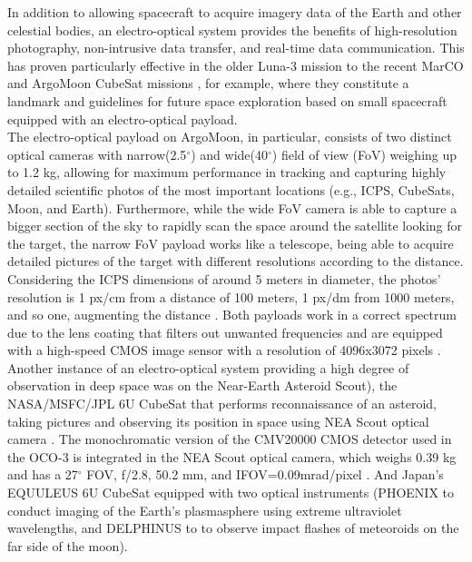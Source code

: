 \documentclass[final,5p,times,sort&compress,twocolumn]{elsarticle}
\begin{document}
In addition to allowing spacecraft to acquire imagery data of the Earth and other celestial bodies, an electro-optical system provides the benefits of high-resolution photography, non-intrusive data transfer, and real-time data communication. This has proven particularly effective in the older Luna-3 mission \cite{siddiqi2018beyond} to the recent MarCO \cite{schoolcraft2017marco} and ArgoMoon CubeSat missions \cite{di2019argomoon}, for example, where they constitute a landmark and guidelines for future space exploration based on small spacecraft equipped with an electro-optical payload. \\The electro-optical payload on ArgoMoon, in particular, consists of two distinct optical cameras \cite{di2019argomoon} with narrow(2.5$^\circ$) and wide(40$^\circ$) field of view (FoV) weighing up to 1.2 kg, allowing for maximum performance in tracking and capturing highly detailed scientific photos of the most important locations (e.g., ICPS, CubeSats, Moon, and Earth). Furthermore, while the wide FoV camera is able to capture a bigger section of the sky to rapidly scan the space around the satellite looking for the target, the narrow FoV payload works like a telescope, being able to acquire detailed pictures of the target with different resolutions according to the distance\cite{simonetti2020argomoon}. Considering the ICPS dimensions of around 5 meters in diameter, the photos’ resolution is 1 px/cm from a distance of 100 meters, 1 px/dm from 1000 meters, and so one, augmenting the distance \cite{simonetti2020argomoon}. Both payloads work in a correct spectrum due to the lens coating that filters out unwanted frequencies and are equipped with a high-speed CMOS image sensor with a resolution of 4096x3072 pixels \cite{simonetti2020argomoon}. Another instance of an electro-optical system providing a high degree of observation in deep space was on the Near-Earth Asteroid Scout), the NASA/MSFC/JPL 6U CubeSat that performs reconnaissance of an asteroid, taking pictures and observing its position in space using NEA Scout optical camera \cite{mission2022nea}. The monochromatic version of the CMV20000 CMOS detector used in the OCO-3 is integrated in the NEA Scout optical camera, which weighs 0.39 kg and has a 27$^\circ$ FOV, f/2.8, 50.2 mm, and IFOV=0.09mrad/pixel \cite{mission2022nea}. And Japan's EQUULEUS 6U CubeSat equipped with two optical instruments \cite{funase2020mission} (PHOENIX to conduct imaging of the Earth's plasmasphere using extreme ultraviolet wavelengths, and DELPHINUS to to observe impact flashes of meteoroids on the far side of the moon).\\
\end{document}

